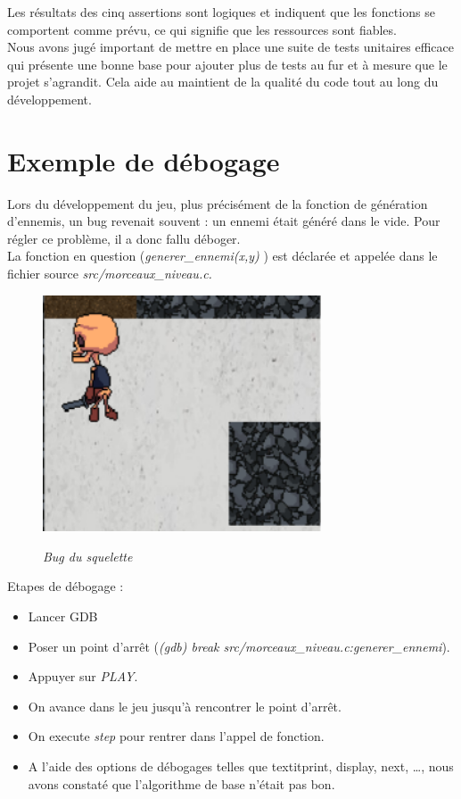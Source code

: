 \documentclass[a4paper,12pt]{article}
\begin{document}
Les résultats des cinq assertions sont logiques et indiquent que les fonctions se comportent comme prévu, ce qui signifie que les ressources sont fiables.\\
Nous avons jugé important de mettre en place une suite de tests unitaires efficace qui présente une bonne base pour ajouter plus de tests au fur et à mesure que le projet s'agrandit. Cela aide au maintient de la qualité du code tout au long du développement.
\section{Exemple de débogage}
Lors du développement du jeu, plus précisément de la fonction de génération d'ennemis, un bug revenait souvent : un ennemi était généré dans le vide. Pour régler ce problème, il a donc fallu déboger.\\
La fonction en question (\textit{generer\_ennemi(x,y)} ) est déclarée et appelée dans le fichier source \textit{src/morceaux\_niveau.c.}\\
\begin{figure}[h]
	\begin{center}
		\includegraphics[height=7cm]{img/bug.png}\\
		\caption{{\emph{Bug du squelette}}}
		\label{Bug}
	\end{center}
\end{figure}
Etapes de débogage : 
\begin{itemize}
	\item Lancer GDB
	\item Poser un point d'arrêt (\textit{(gdb) break src/morceaux\_niveau.c:generer\_ennemi}).
	\item Appuyer sur \textit{PLAY}.
	\item On avance dans le jeu jusqu'à rencontrer le point d'arrêt.
	\item On execute \textit{step} pour rentrer dans l'appel de fonction.
	\item A l'aide des options de débogages telles que textit{print, display, next, \dots}, nous avons constaté que l'algorithme de base n'était pas bon.
\end{itemize}
\end{document}
